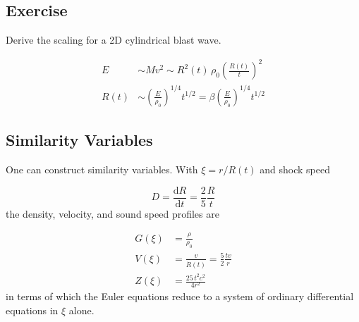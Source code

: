 \documentclass[notoc]{tufte-handout}
\begin{document}
\subsection*{Exercise}

Derive the scaling for a 2D cylindrical blast wave.

\begin{align}
E & \sim M v^2 \sim R^2(t)\, \rho_0 \left( \frac{R(t)}{t} \right)^2 \\
R(t) & \sim \left( \frac{E}{\rho_0} \right)^{1/4} t^{1/2} = \beta \left( \frac{E}{\rho_0} \right)^{1/4} t^{1/2}
\end{align}

\subsection*{Similarity Variables}

One can construct similarity variables. With $\xi = r / R(t)$ and shock speed

\begin{equation}
D = \frac{\mathrm{d}R}{\mathrm{d}t} = \frac{2}{5}\frac{R}{t}
\end{equation}
%
the density, velocity, and sound speed profiles are

\begin{align}
G(\xi) & = \frac{\rho}{\rho_0} \\
V(\xi) & = \frac{v}{\dot{R}(t)} = \frac{5}{2}\frac{t v}{r} \\
Z(\xi) & = \frac{25\, t^2 c^2}{4 r^2}
\end{align}
%
in terms of which the Euler equations reduce to a system of ordinary differential equations in $\xi$ alone. 
\end{document}
